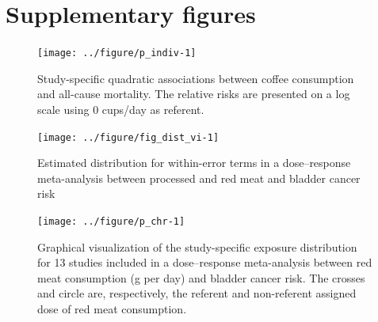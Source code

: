 \documentclass[11pt,a4paper,twoside,openany]{book}\usepackage{knitr}
\begin{document}
{\chapter{Supplementary figures}

\begin{knitrout}\footnotesize
{}\color{fgcolor}\begin{figure}[ht!]

{\centering \texttt{[image: ../figure/p\_indiv-1]} 

}

\caption[Study-specific quadratic associations between coffee consumption and all-cause mortality]{Study-specific quadratic associations between coffee consumption and all-cause mortality. The relative risks are presented on a log scale using 0 cups/day as referent.}\label{fig:p_indiv}
\end{figure}


\end{knitrout}

\begin{knitrout}\footnotesize
{}\color{fgcolor}\begin{figure}[ht!]

{\centering \texttt{[image: ../figure/fig\_dist\_vi-1]} 

}

\caption[Estimated distribution for within-error terms in a dose--response meta-analysis between processed and red meat and bladder cancer risk \citep{crippa2016red}]{Estimated distribution for within-error terms in a dose--response meta-analysis between processed and red meat and bladder cancer risk \citep{crippa2016red}}\label{fig:fig_dist_vi}
\end{figure}


\end{knitrout}

\begin{knitrout}\footnotesize
{}\color{fgcolor}\begin{figure}[ht!]

{\centering \texttt{[image: ../figure/p\_chr-1]} 

}

\caption[Graphical visualization of the study-specific exposure distribution for 13 studies included in a dose--response meta-analysis between red meat consumption (g per day) and bladder cancer risk]{Graphical visualization of the study-specific exposure distribution for 13 studies included in a dose--response meta-analysis between red meat consumption (g per day) and bladder cancer risk. The crosses and circle are, respectively, the referent and non-referent assigned dose of red meat consumption.}\label{fig:p_chr}
\end{figure}



\end{knitrout}}
\end{document}
